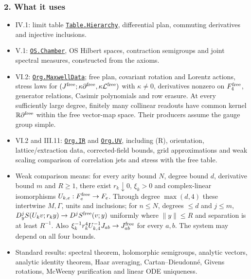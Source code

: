 \documentclass[
  letterpaper,
  11pt]{article}
\providecommand{\tightlist}{%
  \setlength{\itemsep}{0pt}\setlength{\parskip}{0pt}}
\begin{document}
\subsubsection{2. What it uses}\label{what-it-uses-23}

\begin{itemize}
\tightlist
\item
  IV.1: limit table
  \href{https://github.com/yang-mills-group/OpenAI-YM-20261028/blob/3456e5e75cf8d4cd558955a5c7638fba2d68f464/YM/Euclid/Words.lean\#L141-L148}{\texttt{Table.Hierarchy}},
  differential plan, commuting derivatives and injective inclusions.
\item
  V.1:
  \href{https://github.com/yang-mills-group/OpenAI-YM-20261028/blob/3456e5e75cf8d4cd558955a5c7638fba2d68f464/YM/OS/Dynamics.lean\#L57-L61}{\texttt{OS.Chamber}},
  OS Hilbert spaces, contraction semigroups and joint spectral measures,
  constructed from the axioms.
\item
  VI.2:
  \href{https://github.com/yang-mills-group/OpenAI-YM-20261028/blob/3456e5e75cf8d4cd558955a5c7638fba2d68f464/YM/Org/Input.lean\#L159-L170}{\texttt{Org.MaxwellData}};
  free plan, covariant rotation and Lorentz actions, stress laws for
  \((J^{\rm free};\kappa\partial^{\rm free},\kappa\mathcal L^{\rm free})\)
  with \(\kappa\ne0\), derivatives nonzero on \(F^{\rm free}_4\),
  generator relations, Casimir polynomials and row erasure. At every
  sufficiently large degree, finitely many collinear readouts have
  common kernel \(\mathbb R\partial^{\rm free}\) within the free
  vector-map space. Their producers assume the gauge group simple.
\item
  VI.2 and III.11:
  \href{https://github.com/yang-mills-group/OpenAI-YM-20261028/blob/3456e5e75cf8d4cd558955a5c7638fba2d68f464/YM/Org/Input.lean\#L172-L175}{\texttt{Org.IR}}
  and
  \href{https://github.com/yang-mills-group/OpenAI-YM-20261028/blob/3456e5e75cf8d4cd558955a5c7638fba2d68f464/YM/Org/Input.lean\#L177-L186}{\texttt{Org.UV}},
  including (R), orientation, lattice/extraction data, corrected-field
  bounds, grid approximations and weak scaling comparison of correlation
  jets and stress with the free table.
\item
  Weak comparison means: for every arity bound \(N\), degree bound
  \(d\), derivative bound \(m\) and \(R\ge1\), there exist
  \(r_k\downarrow0\), \(\xi_k>0\) and complex-linear isomorphisms
  \(U_{k,e}:F_e^{\rm free}\to F_e\). Through degree \(\max(d,4)\) these
  intertwine \(M,\Gamma\), units and inclusions; for \(n\le N\), degrees
  \(\le d\) and \(j\le m\),
  \(D_y^jS(U_kv;r_ky)\to D^jS^{\rm free}(v;y)\) uniformly where
  \(\|y\|\le R\) and separation is at least \(R^{-1}\). Also
  \(\xi_k^{-1}r_k^4U_{k,4}^{-1}J_{ab}\to J_{ab}^{\rm free}\) for every
  \(a,b\). The system may depend on all four bounds.
\item
  Standard results: spectral theorem, holomorphic semigroups, analytic
  vectors, analytic identity theorem, Haar averaging, Cartan--Dieudonné,
  Givens rotations, McWeeny purification and linear ODE uniqueness.
\end{itemize}
\end{document}
